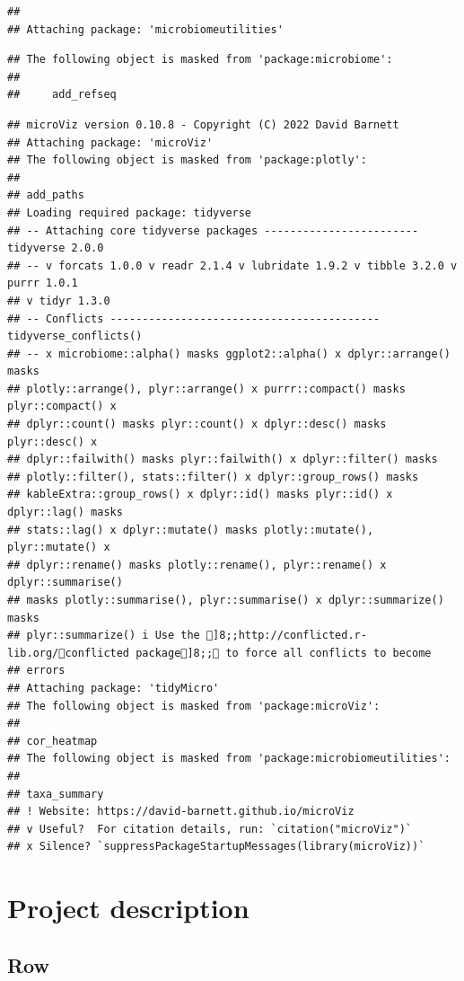 \documentclass[
]{article}
\begin{document}
\begin{verbatim}
## 
## Attaching package: 'microbiomeutilities'
\end{verbatim}

\begin{verbatim}
## The following object is masked from 'package:microbiome':
## 
##     add_refseq
\end{verbatim}

\begin{verbatim}
## microViz version 0.10.8 - Copyright (C) 2022 David Barnett
## Attaching package: 'microViz'
## The following object is masked from 'package:plotly':
## 
## add_paths
## Loading required package: tidyverse
## -- Attaching core tidyverse packages ------------------------ tidyverse 2.0.0
## -- v forcats 1.0.0 v readr 2.1.4 v lubridate 1.9.2 v tibble 3.2.0 v purrr 1.0.1
## v tidyr 1.3.0
## -- Conflicts ------------------------------------------ tidyverse_conflicts()
## -- x microbiome::alpha() masks ggplot2::alpha() x dplyr::arrange() masks
## plotly::arrange(), plyr::arrange() x purrr::compact() masks plyr::compact() x
## dplyr::count() masks plyr::count() x dplyr::desc() masks plyr::desc() x
## dplyr::failwith() masks plyr::failwith() x dplyr::filter() masks
## plotly::filter(), stats::filter() x dplyr::group_rows() masks
## kableExtra::group_rows() x dplyr::id() masks plyr::id() x dplyr::lag() masks
## stats::lag() x dplyr::mutate() masks plotly::mutate(), plyr::mutate() x
## dplyr::rename() masks plotly::rename(), plyr::rename() x dplyr::summarise()
## masks plotly::summarise(), plyr::summarise() x dplyr::summarize() masks
## plyr::summarize() i Use the ]8;;http://conflicted.r-lib.org/conflicted package]8;; to force all conflicts to become
## errors
## Attaching package: 'tidyMicro'
## The following object is masked from 'package:microViz':
## 
## cor_heatmap
## The following object is masked from 'package:microbiomeutilities':
## 
## taxa_summary
## ! Website: https://david-barnett.github.io/microViz
## v Useful?  For citation details, run: `citation("microViz")`
## x Silence? `suppressPackageStartupMessages(library(microViz))`
\end{verbatim}

\hypertarget{project-description}{%
\section{Project description}\label{project-description}}

\hypertarget{row}{%
\subsection{Row}\label{row}}
\end{document}
